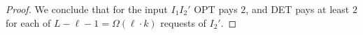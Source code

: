 \begin{proof}
  We conclude that for the input $I_1I_2'$ OPT pays $2$, and DET pays at least $2$ for each of $L - \ell - 1 = \Omega(\ell \cdot k)$ requests of $I_2'$.

 

  

 
  

  
  
  

  
  
\end{proof}

